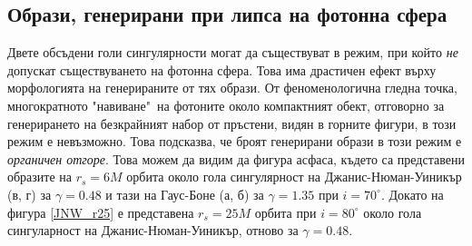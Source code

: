 \subsection{Образи, генерирани при липса на фотонна сфера}

Двете обсъдени голи сингулярности могат да съществуват в режим, при който \emph{не} допускат съществуването на фотонна сфера. Това има драстичен ефект върху морфологията на генерираните от тях образи. От феноменологична гледна точка, многократното "навиване"$\,$ на фотоните около компактният обект, отговорно за генерирането на безкрайният набор от пръстени, видян в горните фигури, в този режим е невъзможно. Това подсказва, че броят генерирани образи в този режим е \emph{органичен отгоре}. Това можем да видим да фигура асфаса, където са представени образите на $r_s = 6M$ орбита около гола сингулярност на Джанис-Нюман-Уиникър (в, г) за $\gamma = 0.48$ и тази на Гаус-Боне (а, б) за $\gamma = 1.35$ при $i = 70^\circ$. Докато на фигура \ref{JNW_r25} е представена $r_s = 25M$ орбита при $i = 80^\circ$ около гола сингуларност на Джанис-Нюман-Уиникър, отново за $\gamma = 0.48$. \newpage

